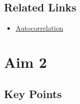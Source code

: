 \documentclass{article}
\begin{document}
\subsection*{Related Links}
\begin{itemize}
    \item \href{https://itl.nist.gov/div898/handbook/eda/section3/eda35c.htm}{Autocorrelation}
\end{itemize}


\section{Aim 2}
\subsection{Key Points}
\end{document}
